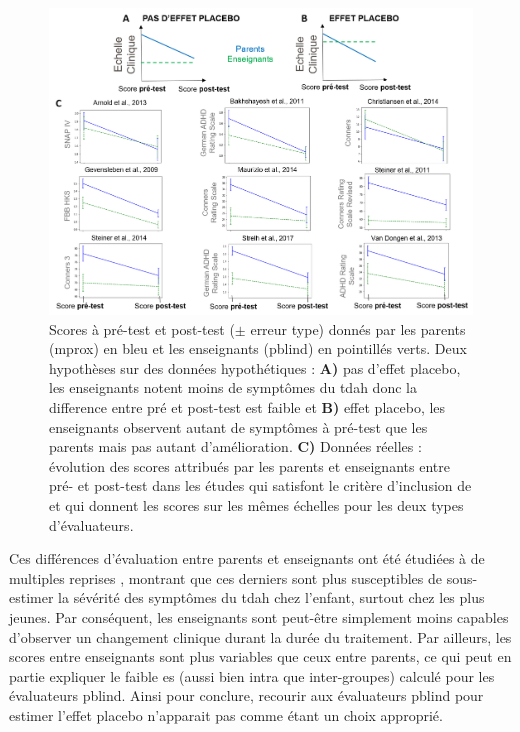 \begin{figure}[h!]
  \centering
	\includegraphics[width=1\linewidth]{figures/chapter-3/factors-pblind-discussion} 
  \caption{Scores à pré-test et post-test ($\pm$ erreur type) donnés par les parents (\gls{mprox}) en bleu et les enseignants (\gls{pblind}) en pointillés verts. 
	Deux hypothèses sur des données hypothétiques : \textbf{A)} pas d'effet placebo, les enseignants notent moins de symptômes du \gls{tdah} donc la difference entre pré et post-test est faible
	et \textbf{B)} effet placebo, les enseignants observent autant de symptômes à pré-test que les parents mais pas autant d'amélioration. \textbf{C)} Données réelles : 
	évolution des scores attribués par les parents et enseignants entre pré- et post-test dans les études qui satisfont le critère d'inclusion de \citeauthor{Cortese2016} 
	et qui donnent les scores sur les mêmes échelles pour les deux types d'évaluateurs.}
  \label{Figure:factors_pblind_discussion}
\end{figure}

Ces différences d'évaluation entre parents et enseignants ont été étudiées à de multiples reprises \citep{Sollie2013, Narad2015, Minder2018}, montrant que 
ces derniers sont plus susceptibles de sous-estimer la sévérité des symptômes du \gls{tdah} chez l'enfant, surtout chez les plus jeunes. Par conséquent, les 
enseignants sont peut-être simplement moins capables d'observer un changement clinique durant la durée du traitement. Par ailleurs, les scores entre enseignants 
sont plus variables que ceux entre parents, ce qui peut en partie expliquer le faible \gls{es} (aussi bien intra que inter-groupes) calculé pour les évaluateurs
\gls{pblind}. Ainsi pour conclure, recourir aux évaluateurs \gls{pblind} pour estimer l'effet placebo n'apparait pas comme étant un choix approprié. 

